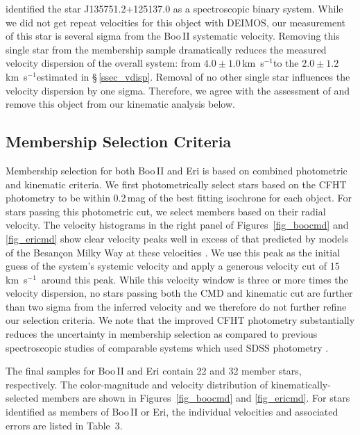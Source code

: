 \documentclass{../tex_files/emulateapj}
\newcommand{\kms}{\,km~s$^{-1}$}
\begin{document}
\citet{ji2015} identified the star  J135751.2+125137.0 as a
spectroscopic binary system.   While we did not get repeat velocities for this object with DEIMOS, our measurement of this star is several sigma from the Boo\,II systematic velocity.   Removing this single star from the membership sample dramatically reduces the measured velocity dispersion of the overall system:  from $4.0\pm 1.0$\kms to the $2.0\pm1.2$\kms estimated in \S\,\ref{ssec_vdisp}.  Removal of no other single star influences the velocity dispersion by one sigma.  Therefore, we agree with the assessment of \citet{ji2015} and remove this object from our kinematic analysis below.

  


\subsection{Membership Selection Criteria} \label{ssec_members}

Membership selection for both Boo\,II and Eri is based on combined
photometric and kinematic criteria.  We first photometrically select
stars based on the CFHT photometry to be within 0.2\,mag of the best
fitting isochrone for each object.  For stars passing this photometric
cut, we select members based on their radial velocity.  The velocity
histograms in the right panel of Figures~\ref{fig_boocmd} and
\ref{fig_ericmd} show clear velocity peaks well in excess of that
predicted by models of the Besan\c con Milky Way at these velocities
\citep{robin03a}.  We use this peak as the initial guess of the system's
 systemic velocity and apply a generous velocity cut of 15\kms\ around
this peak.  While this velocity window is three or more times the velocity
dispersion, no stars passing both the CMD and kinematic cut are
further than two sigma from the inferred velocity and we therefore do
not further refine our selection criteria.  We note that the improved
CFHT photometry substantially reduces the uncertainty in membership
selection as compared to previous spectroscopic studies of comparable
systems which used SDSS photometry \citep{simon07a,geha09a, simon11a}.

The final samples for Boo\,II and Eri contain 22 and 32 member stars,
respectively.  The color-magnitude and velocity distribution of
kinematically-selected members are shown in Figures~\ref{fig_boocmd}
and \ref{fig_ericmd}.  For stars identified as members of Boo\,II or
Eri, the individual velocities and associated errors are listed in
Table~3.
\end{document}
